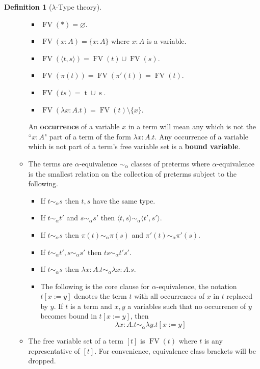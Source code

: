 \documentclass[12pt]{article}
\theoremstyle{plain}
\theoremstyle{definition}
\newtheorem{defn}[thm]{Definition} %
\begin{document}
\begin{defn}[$\lambda$-Type theory]
\begin{enumerate}
\begin{itemize}
				\begin{itemize}
					\item $\operatorname{FV}(\ast) = \varnothing$.
					\item $\operatorname{FV}(x: A) = \{ x : A \}$ where $x:A$ is a variable.
					\item $\operatorname{FV}(\langle t, s \rangle) = \operatorname{FV}(t) \cup \operatorname{FV}(s)$.
					\item $\operatorname{FV}(\pi(t)) = \operatorname{FV}(\pi'(t)) = \operatorname{FV}(t)$.
					\item $\operatorname{FV}(ts) = \operatorname{t} \cup \operatorname{s}$.
					\item $\operatorname{FV}(\lambda x:A. t) = \operatorname{FV}(t) \setminus \{ x \}$.
					\end{itemize}
				An \textbf{occurrence} of a variable $x$ in a term will mean any which is not the ``$x:A$" part of a term of the form $\lambda x:A. t$. Any occurrence of a variable which is not part of a term's free variable set is a \textbf{bound variable}.
				\item The terms are $\alpha$-equivalence $\sim_\alpha$ classes of preterms where $\alpha$-equivalence is the smallest relation on the collection of preterms subject to the following.
				\begin{itemize}
					\item If $t \sim_\alpha s$ then $t, s$ have the same type.
					\item If $t \sim_\alpha t'$ and $s \sim_\alpha s'$ then $\langle t, s \rangle \sim_\alpha \langle t', s' \rangle$.
					\item If $t \sim_\alpha s$ then $\pi(t) \sim_\alpha \pi(s)$ and $\pi'(t) \sim_\alpha \pi'(s)$.
					\item If $t \sim_\alpha t', s \sim_\alpha s'$ then $ts \sim_\alpha t's'$.
					\item If $t \sim_\alpha s$ then $\lambda x:A. t \sim_\alpha \lambda x:A. s$.
					\item The following is the core clause for $\alpha$-equivalence, the notation $t[x := y]$ denotes the term $t$ with all occurrences of $x$ in $t$ replaced by $y$. If $t$ is a term and $x,y$ a variables such that no occurrence of $y$ becomes bound in $t[x := y]$, then
					\begin{equation}
						\lambda x:A. t \sim_\alpha \lambda y. t[x := y]
					\end{equation}
				\end{itemize}
				\item The free variable set of a term $[t]$ is $\operatorname{FV}(t)$ where $t$ is any representative of $[t]$. For convenience, equivalence class brackets will be dropped.

\end{itemize}
\end{enumerate}
\end{defn}
\end{document}
